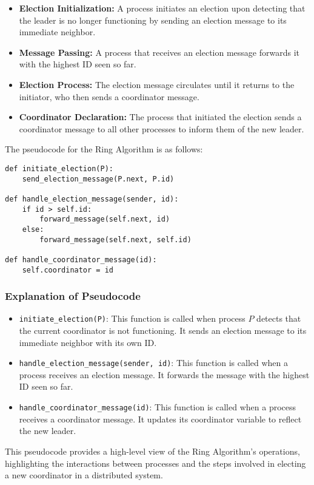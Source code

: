 \begin{itemize}
    \item \textbf{Election Initialization:} A process initiates an election upon detecting that the leader is no longer functioning by sending an election message to its immediate neighbor.
    \item \textbf{Message Passing:} A process that receives an election message forwards it with the highest ID seen so far.
    \item \textbf{Election Process:} The election message circulates until it returns to the initiator, who then sends a coordinator message.
    \item \textbf{Coordinator Declaration:} The process that initiated the election sends a coordinator message to all other processes to inform them of the new leader.
\end{itemize}
The pseudocode for the Ring Algorithm is as follows:

\begin{verbatim}
def initiate_election(P):
    send_election_message(P.next, P.id)

def handle_election_message(sender, id):
    if id > self.id:
        forward_message(self.next, id)
    else:
        forward_message(self.next, self.id)

def handle_coordinator_message(id):
    self.coordinator = id
\end{verbatim}

\subsubsection{Explanation of Pseudocode}

\begin{itemize}
    \item \texttt{initiate\_election(P)}: This function is called when process \(P\) detects that the current coordinator is not functioning. It sends an election message to its immediate neighbor with its own ID.
    \item \texttt{handle\_election\_message(sender, id)}: This function is called when a process receives an election message. It forwards the message with the highest ID seen so far.
    \item \texttt{handle\_coordinator\_message(id)}: This function is called when a process receives a coordinator message. It updates its coordinator variable to reflect the new leader.
\end{itemize}
This pseudocode provides a high-level view of the Ring Algorithm's operations, highlighting the interactions between processes and the steps involved in electing a new coordinator in a distributed system.

